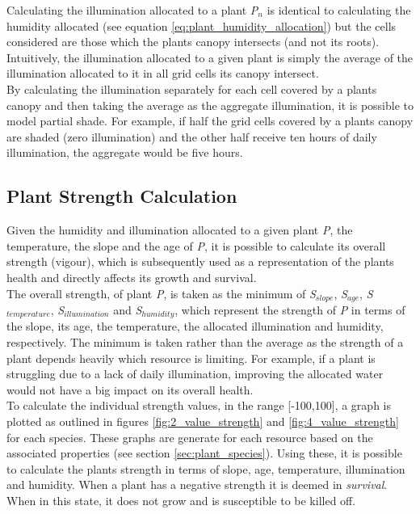 Calculating the illumination allocated to a plant \textit{P$_{n}$} is identical to calculating the humidity allocated (see equation \ref{eq:plant_humidity_allocation}) but the cells considered are those which the plants canopy intersects (and not its roots). Intuitively, the illumination allocated to a given plant is simply the average of the illumination allocated to it in all grid cells its canopy intersect.\\

By calculating the illumination separately for each cell covered by a plants canopy and then taking the average as the aggregate illumination, it is possible to model partial shade. For example, if half the grid cells covered by a plants canopy are shaded (zero illumination) and the other half receive ten hours of daily illumination, the aggregate would be five hours.\\

\subsection{Plant Strength Calculation} \label{subsec:plant_strength_calc}

Given the humidity and illumination allocated to a given plant \textit{P}, the temperature, the slope and the age of \textit{P}, it is possible to calculate its overall strength (vigour), which is subsequently used as a representation of the plants health and directly affects its growth and survival. \\
The overall strength, of plant \textit{P}, is taken as the minimum of \textit{S$_{slope}$}, \textit{S$_{age}$}, \textit{S$_{temperature}$}, \textit{S$_{illumination}$} and \textit{S$_{humidity}$}, which represent the strength of \textit{P} in terms of the slope, its age, the temperature, the allocated illumination and humidity, respectively. The minimum is taken rather than the average as the strength of a plant depends heavily which resource is limiting. For example, if a plant is struggling due to a lack of daily illumination, improving the allocated water would not have a big impact on its overall health.\\
To calculate the individual strength values, in the range [-100,100], a graph is plotted as outlined in figures \ref{fig:2_value_strength} and \ref{fig:4_value_strength} for each species. These graphs are generate for each resource based on the associated properties (see section \ref{sec:plant_species}). Using these, it is possible to calculate the plants strength in terms of slope, age, temperature, illumination and humidity. When a plant has a negative strength it is deemed in \textit{survival}. When in this state, it does not grow and is susceptible to be killed off.\\

